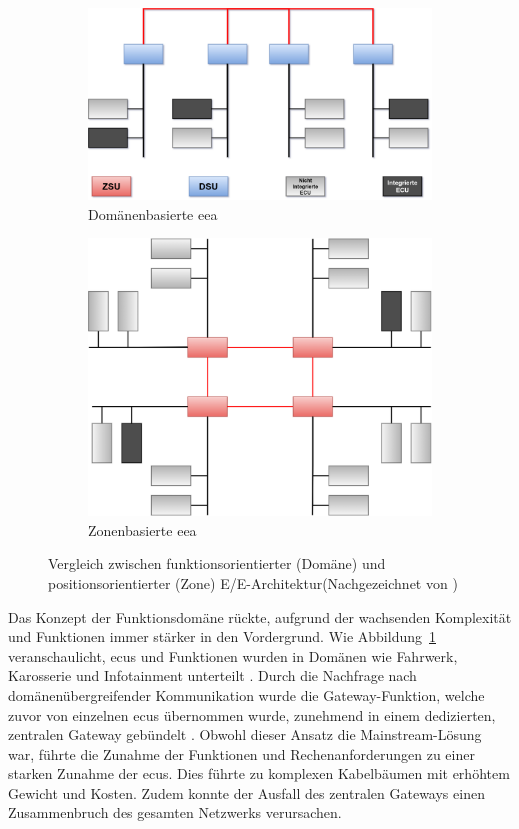 \begin{figure}[h!]
  \centering
  \begin{subfigure}{.5\textwidth}
    \centering
    \includegraphics[width=\linewidth]{figures/02Grundlagen/Domainbasiert.drawio.png}
    \caption{Domänenbasierte \gls{eea}}
    \label{fig:deea}
  \end{subfigure}%
  \begin{subfigure}{.5\textwidth}
    \centering
    \includegraphics[width=.75\linewidth]{figures/02Grundlagen/Zonenbasiert.drawio.png}
    \caption{Zonenbasierte \gls{eea}}
    \label{fig:zeea}
  \end{subfigure}
  \caption{Vergleich zwischen funktionsorientierter (Domäne) und positionsorientierter (Zone) E/E-Architektur(Nachgezeichnet von \cite{wang2024review})}
  \label{fig:eea}
\end{figure}


Das Konzept der Funktionsdomäne rückte, aufgrund der wachsenden Komplexität und Funktionen immer stärker in den Vordergrund. Wie Abbildung~\ref{fig:deea} veranschaulicht, \glspl{ecu} und Funktionen wurden in Domänen wie Fahrwerk, Karosserie und Infotainment unterteilt \cite{jiang2019vehicle}. Durch die Nachfrage nach domänenübergreifender Kommunikation wurde die Gateway-Funktion, welche zuvor von einzelnen \glspl{ecu} übernommen wurde, zunehmend in einem dedizierten, zentralen Gateway gebündelt \cite{jiang2019vehicle}\cite{zhuRequirementsDrivenAutomotiveElectrical2021}.
Obwohl dieser Ansatz die Mainstream-Lösung war, führte die Zunahme der Funktionen und Rechenanforderungen zu einer starken Zunahme der \glspl{ecu}. Dies führte zu komplexen Kabelbäumen mit erhöhtem Gewicht und Kosten. Zudem konnte der Ausfall des zentralen Gateways einen Zusammenbruch des gesamten Netzwerks verursachen.

